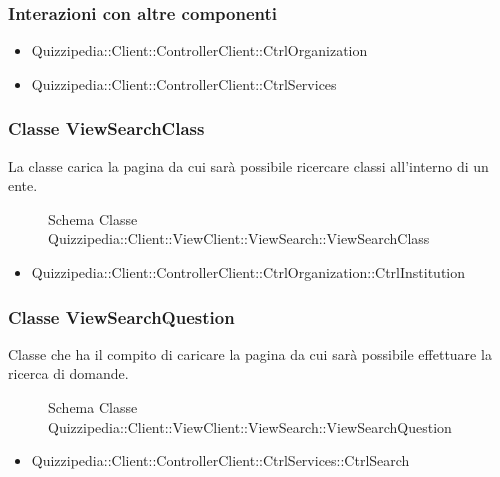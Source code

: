\subsubsection{Interazioni con altre componenti}
\begin{itemize}
\item Quizzipedia::Client::ControllerClient::CtrlOrganization
\item Quizzipedia::Client::ControllerClient::CtrlServices
\end{itemize}
\subsubsection{Classe ViewSearchClass}
La classe carica la pagina da cui sarà possibile ricercare classi all'interno di un ente.
\begin{figure}[H]
\centering
\noindent{}
\caption[Schema Classe ViewSearchClass]{Schema Classe Quizzipedia::Client::ViewClient::ViewSearch::ViewSearchClass}
\end{figure}
\begin{itemize}
\item Quizzipedia::Client::ControllerClient::CtrlOrganization::CtrlInstitution
\end{itemize}
\subsubsection{Classe ViewSearchQuestion}
Classe che ha il compito di caricare la pagina da cui sarà possibile effettuare la ricerca di domande.
\begin{figure}[H]
\centering
\noindent{}
\caption[Schema Classe ViewSearchQuestion]{Schema Classe Quizzipedia::Client::ViewClient::ViewSearch::ViewSearchQuestion}
\end{figure}
\begin{itemize}
\item Quizzipedia::Client::ControllerClient::CtrlServices::CtrlSearch
\end{itemize}
